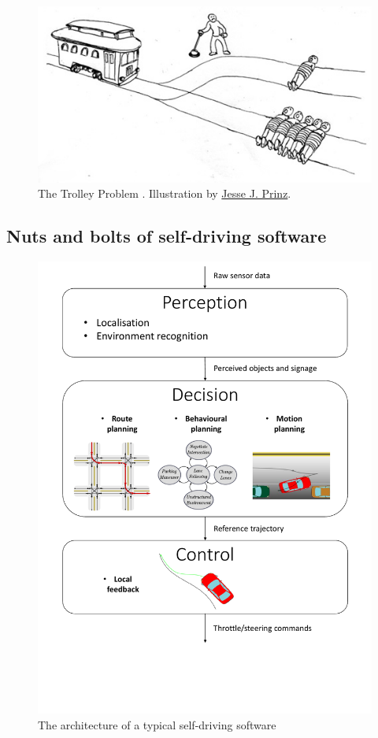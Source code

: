 \begin{figure}[tp]
	\centering
	\includegraphics[width=0.7\linewidth]{img/trolley}
	\caption{The Trolley Problem \citep{Foot1967}. Illustration by \href{http://subcortex.com/}{Jesse J. Prinz}.}
	\label{fig:trolley}
\end{figure}

\subsection{Nuts and bolts of self-driving software}

\begin{figure}[th]
	\centering
	\includegraphics[trim={0 5cm 0 0}, clip, width=0.7\linewidth]{img/pipeline}
	\caption{The architecture of a typical self-driving software}
	\label{fig:robotics-pipeline}
\end{figure}

